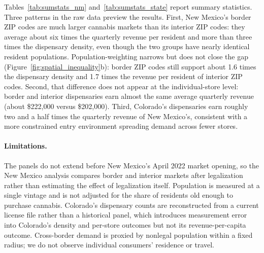 Tables~\ref{tab:sumstats_nm} and~\ref{tab:sumstats_state} report summary
statistics. Three patterns in the raw data preview the results. First, New
Mexico's border ZIP codes are much larger cannabis markets than its interior
ZIP codes: they average about six times the quarterly revenue per resident and
more than three times the dispensary density, even though the two groups have
nearly identical resident populations. Population-weighting narrows but does not
close the gap (Figure~\ref{fig:spatial_inequality}b): border ZIP codes still
support about 1.6 times the dispensary density and 1.7 times the revenue per
resident of interior ZIP codes. Second, that difference does not appear at the
individual-store level: border and interior dispensaries earn almost the same
average quarterly revenue (about \$222{,}000 versus \$202{,}000). Third,
Colorado's dispensaries earn roughly two and a half times the quarterly revenue
of New Mexico's, consistent with a more constrained entry environment spreading
demand across fewer stores.



\paragraph{Limitations.} The panels do not extend before New Mexico's April 2022
market opening, so the New Mexico analysis compares border and interior markets
after legalization rather than estimating the effect of legalization itself.
Population is measured at a single vintage and is not adjusted for the share of
residents old enough to purchase cannabis. Colorado's dispensary counts are
reconstructed from a current license file rather than a historical panel, which
introduces measurement error into Colorado's density and per-store outcomes but
not its revenue-per-capita outcome. Cross-border demand is proxied by nonlegal
population within a fixed radius; we do not observe individual consumers'
residence or travel.
